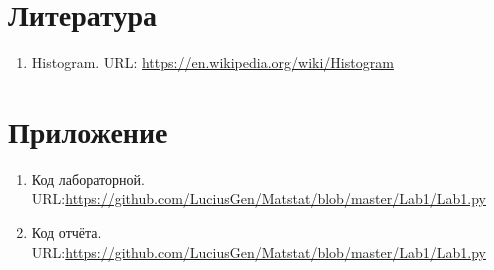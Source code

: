 \documentclass[12pt,a4paper]{article}
\begin{document}
\section{Литература}
	\begin{enumerate}
		\item \label{Histogram} Histogram. URL: \url{https://en.wikipedia.org/wiki/Histogram}
	\end{enumerate}
\section{Приложение}
	\begin{enumerate}
		\item \label{Code} Код лабораторной. URL:\url{https://github.com/LuciusGen/Matstat/blob/master/Lab1/Lab1.py}
		
		\item Код отчёта. URL:\url{https://github.com/LuciusGen/Matstat/blob/master/Lab1/Lab1.py}
		
	\end{enumerate}
\end{document}
